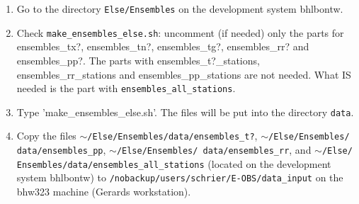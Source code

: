 \documentclass[a4paper]{article}
\begin{document}
\begin{enumerate}
\item Go to the directory \texttt{Else/Ensembles} on the development
system bhlbontw.
\item Check \texttt{make\_ensembles\_else.sh}: uncomment (if needed)
  only the parts for ensembles\_tx?, ensembles\_tn?, ensembles\_tg?,
  ensembles\_rr? and ensembles\_pp?. The parts with
  ensembles\_t?\_stations, ensembles\_rr\_stations and
  ensembles\_pp\_stations are not needed. What IS needed is the part
  with \texttt{ensembles\_all\_stations}.
\item Type 'make\_ensembles\_else.sh'. The files will be put into the
  directory \texttt{data}.
\item Copy the files
  \texttt{$\sim$/Else/Ensembles/data/ensembles\_t?},
  \texttt{$\sim$/Else/Ensembles/ data/ensembles\_pp},
  \texttt{$\sim$/Else/Ensembles/ data/ensembles\_rr}, and 
  \texttt{$\sim$/Else/ Ensembles/data/ensembles\_all\_stations}
  (located on the development system bhlbontw) to
  \texttt{/nobackup/users/schrier/E-OBS/data\_input} on
  the bhw323 machine (Gerards workstation).\\

\smallskip 


\end{enumerate}
\end{document}
